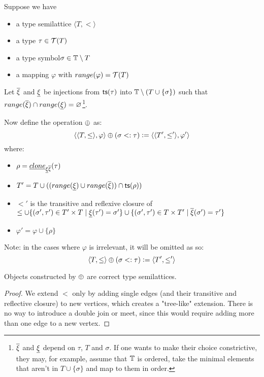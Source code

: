 \documentclass[main.tex]{subfiles}
\begin{document}
\begin{defn}
    \label{def:subadd}
    Suppose we have
    \begin{itemize}
        \item a type semilattice $\langle T, \less \rangle$
        \item a type $\tau \in \mathcal{T}( T )$
        \item a type symbol$\sigma \in \mathbb{T} \setminus T$
        \item a mapping $\varphi$ with $range(\varphi) = \mathcal{T}( T )$
    \end{itemize}
    Let $\overline{\xi}$ and $\underline{\xi}$ be injections from
    $\mathsf{ts}(\tau)$ into $\mathbb{T} \setminus (T \cup \{ \sigma \})$ such that
    $range(\overline{\xi}) \cap range(\underline{\xi}) = \varnothing$\footnote{
        $\overline{\xi}$ and $\underline{\xi}$ depend on $\tau$, $T$ and
        $\sigma$. If one wants to make their choice constrictive, they may,
        for example, assume that $\mathbb{T}$ is ordered, take the minimal
        elements that aren't in $T \cup \{ \sigma \}$ and map to them in
        order.
    }.

    Now define the operation $\oplus$ as:
        \[ \langle \langle T, \leq \rangle, \varphi \rangle
            \oplus (\sigma <: \tau)
            \vcentcolon=
            \langle \langle T', \leq' \rangle, \varphi' \rangle
        \] where:
    \begin{itemize}
        \item $\rho = \underline{clone}_{\underline{\xi} \overline{\xi}}(\tau)$
        \item $T' = T \cup ((range(\underline{\xi}) \cup range(\overline{\xi})) \cap \mathsf{ts}(\rho))$
        \item $\less'$ is the transitive and reflexive closure of
            $\leq \cup \{ (\sigma', \tau') \in T' \times T \mid \underline{\xi}(\tau') = \sigma' \}
                   \cup \{ (\sigma', \tau') \in T \times T' \mid \overline{\xi}(\sigma') = \tau' \}$
        \item $\varphi' = \varphi \cup \{ \rho \}$
    \end{itemize}

    Note: in the cases where $\varphi$ is irrelevant, it will be omitted as
    so:
    \[ \langle T, \leq \rangle
        \oplus (\sigma <: \tau)
        \vcentcolon=
        \langle T', \leq' \rangle
    \]
\end{defn}

\begin{property}
    Objects constructed by $\oplus$ are correct type semilattices.
\end{property}
\begin{proof}
    We extend $\less$ only by adding single edges (and their transitive and
    reflective closure) to new vertices, which creates a "tree-like" extension.
    There is no way to introduce a double join or meet, since this would
    require adding more than one edge to a new vertex.
\end{proof}
\end{document}
